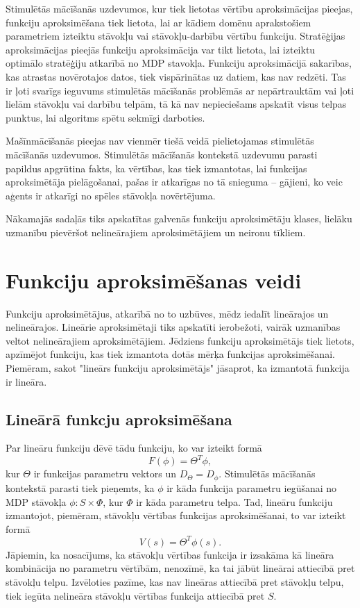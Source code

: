 \documentclass{ludis} %
\begin{document}
Stimulētās mācīšanās uzdevumos, kur tiek lietotas vērtību aproksimācijas pieejas, funkciju aproksimēšana tiek lietota, lai ar kādiem domēnu aprakstošiem parametriem izteiktu stāvokļu vai stāvokļu-darbību vērtību funkciju. Stratēģijas aproksimācijas pieejās funkciju aproksimācija var tikt lietota, lai izteiktu optimālo stratēģiju atkarībā no MDP stavokļa.
Funkciju aproksimācijā sakarības, kas atrastas novērotajos datos, tiek vispārinātas uz datiem, kas nav redzēti. Tas ir ļoti svarīgs ieguvums stimulētās mācīšanās problēmās ar nepārtrauktām vai ļoti lielām stāvokļu vai darbību telpām, tā kā nav nepieciešams apskatīt visus telpas punktus, lai algoritms spētu sekmīgi darboties.

Mašīnmācīšanās pieejas nav vienmēr tiešā veidā pielietojamas stimulētās mācīšanās uzdevumos.
Stimulētās mācīšanās kontekstā uzdevumu parasti papildus apgrūtina fakts, ka vērtības, kas tiek izmantotas, lai funkcijas aproksimētāja pielāgošanai, pašas ir atkarīgas no tā snieguma -- gājieni, ko veic aģents ir atkarīgi no spēles stāvokļa novērtējuma.

Nākamajās sadaļās tiks apskatītas galvenās funkciju aproksimētāju klases, lielāku uzmanību pievēršot nelineārajiem aproksimētājiem un neironu tīkliem.

\section{Funkciju aproksimēšanas veidi}
Funkciju aproksimētājus, atkarībā no to uzbūves, mēdz iedalīt lineārajos un nelineārajos. Lineārie aproksimētaji tiks apskatīti ierobežoti, vairāk uzmanības veltot nelineārajiem aproksimētājiem.
Jēdziens funkciju aproksimētājs tiek lietots, apzīmējot funkciju, kas tiek izmantota dotās mērķa funkcijas aproksimēšanai.
Piemēram, sakot "lineārs funkciju aproksimētājs" jāsaprot, ka izmantotā funkcija ir lineāra.

\subsection{Lineārā funkcju aproksimēšana}
Par lineāru funkciju dēvē tādu funkciju, ko var izteikt formā
\[
	F(\phi) = \Theta^T \phi,
\]
kur $\Theta$ ir funkcijas parametru vektors un $D_\Theta = D_\phi$. %
Stimulētās mācīšanās kontekstā parasti tiek pieņemts, ka $\phi$ ir kāda funkcija parametru iegūšanai no MDP stāvokļa $\phi : S \times \Phi$, kur $\Phi$ ir kāda parametru telpa.
Tad, lineāru funkciju izmantojot, piemēram, stāvokļu vērtības funkcijas aproksimēšanai, to var izteikt formā
\[
	V(s) = \Theta^T \phi(s).
\]
Jāpiemin, ka nosacījums, ka stāvokļu vērtības funkcija ir izsakāma kā lineāra kombinācija no parametru vērtībām, nenozīmē, ka tai jābūt lineārai attiecībā pret stāvokļu telpu.
Izvēloties pazīme, kas nav lineāras attiecībā pret stāvokļu telpu, tiek iegūta nelineāra stāvokļu vērtības funkcija attiecībā pret $S$.
\end{document}
